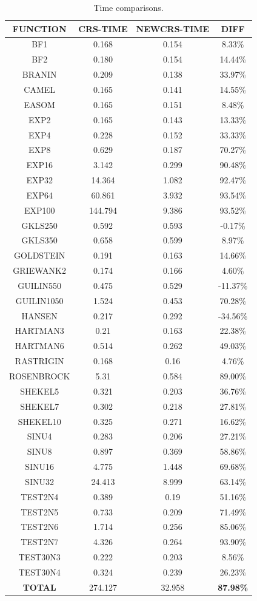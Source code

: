 \documentclass[symmetry,article,submit,moreauthors,pdftex]{mdpi}
\begin{document}
\begin{table}
\caption{Time comparisons.\label{tab:Experimenting-with-time}}

\begin{centering}
\begin{tabular}{|c|c|c|c|}
\hline 
FUNCTION & CRS-TIME & NEWCRS-TIME & DIFF \tabularnewline
\hline 
\hline 
BF1 & 0.168 & 0.154 & 8.33\% \tabularnewline
\hline 
BF2 & 0.180 & 0.154 & 14.44\% \tabularnewline
\hline 
BRANIN & 0.209 & 0.138 & 33.97\% \tabularnewline
\hline 
CAMEL & 0.165 & 0.141 & 14.55\% \tabularnewline
\hline 
EASOM & 0.165 & 0.151 & 8.48\% \tabularnewline
\hline 
EXP2 & 0.165 & 0.143 & 13.33\% \tabularnewline
\hline 
EXP4 & 0.228 & 0.152 & 33.33\% \tabularnewline
\hline 
EXP8 & 0.629 & 0.187 & 70.27\% \tabularnewline
\hline 
EXP16 & 3.142 & 0.299 & 90.48\% \tabularnewline
\hline 
EXP32 & 14.364 & 1.082 & 92.47\% \tabularnewline
\hline 
EXP64 & 60.861 & 3.932 & 93.54\%\tabularnewline
\hline 
EXP100 & 144.794 & 9.386 & 93.52\% \tabularnewline
\hline 
GKLS250 & 0.592 & 0.593 & -0.17\%  \tabularnewline
\hline 
GKLS350 & 0.658 & 0.599 & 8.97\%  \tabularnewline
\hline 
GOLDSTEIN & 0.191 & 0.163 & 14.66\% \tabularnewline
\hline 
GRIEWANK2 & 0.174 & 0.166 & 4.60\%\tabularnewline
\hline 
GUILIN550 & 0.475 & 0.529 & -11.37\% \tabularnewline
\hline 
GUILIN1050 & 1.524 & 0.453 & 70.28\% \tabularnewline
\hline 
HANSEN & 0.217 & 0.292 & -34.56\% \tabularnewline
\hline 
HARTMAN3 & 0.21 & 0.163 & 22.38\% \tabularnewline
\hline 
HARTMAN6 & 0.514 & 0.262 & 49.03\% \tabularnewline
\hline 
RASTRIGIN & 0.168 & 0.16 & 4.76\% \tabularnewline
\hline 
ROSENBROCK & 5.31 & 0.584 & 89.00\% \tabularnewline
\hline 
SHEKEL5 & 0.321 & 0.203 & 36.76\% \tabularnewline
\hline 
SHEKEL7 & 0.302 & 0.218 & 27.81\% \tabularnewline
\hline 
SHEKEL10 & 0.325 & 0.271 & 16.62\% \tabularnewline
\hline 
SINU4 & 0.283 & 0.206 & 27.21\% \tabularnewline
\hline 
SINU8 & 0.897 & 0.369 & 58.86\% \tabularnewline
\hline 
SINU16 & 4.775 & 1.448 & 69.68\% \tabularnewline
\hline 
SINU32 & 24.413 & 8.999 & 63.14\% \tabularnewline
\hline 
TEST2N4 & 0.389 & 0.19 & 51.16\% \tabularnewline
\hline 
TEST2N5 & 0.733 & 0.209 & 71.49\% \tabularnewline
\hline 
TEST2N6 & 1.714 & 0.256 & 85.06\% \tabularnewline
\hline 
TEST2N7 & 4.326 & 0.264 & 93.90\% \tabularnewline
\hline 
TEST30N3 & 0.222 & 0.203 & 8.56\% \tabularnewline
\hline 
TEST30N4 & 0.324 & 0.239 & 26.23\% \tabularnewline
\hline 
\textbf{TOTAL} & 274.127 & 32.958 & \textbf{87.98\%} \tabularnewline
\hline 
\end{tabular}
\par\end{centering}
\end{table}
\end{document}
